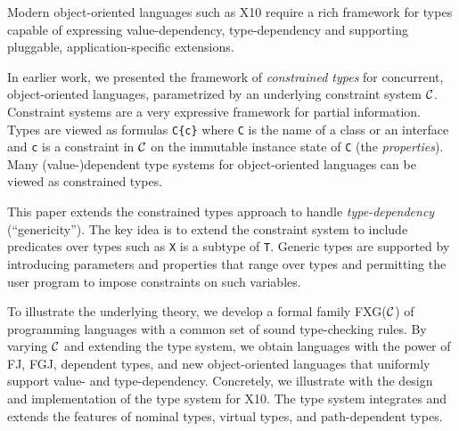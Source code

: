 Modern object-oriented languages such as X10 require a rich framework
for types capable of expressing value-dependency, type-dependency
and supporting pluggable, application-specific extensions.

In earlier work, we presented the framework of \emph{constrained
types} for concurrent, object-oriented languages, parametrized by
an underlying constraint system $\cal C$. Constraint systems are a
very expressive framework for partial information. Types are viewed
as formulas \texttt{C\{c\}} where \texttt{C} is the name of a class
or an interface and \texttt{c} is a constraint in $\cal C$ on the
immutable instance state of \texttt{C} (the \emph{properties}).
Many (value-)dependent type systems for object-oriented languages
can be viewed as constrained types.

This paper extends the constrained types approach to handle
\emph{type-dependency} (``genericity''). The key idea is to extend
the constraint system to include predicates over types such as
\texttt{X} is a subtype of \texttt{T}.  Generic types are supported
by introducing parameters and properties that range over types and
permitting the user program to impose constraints on such variables.

To illustrate the underlying theory, we develop a formal family
FXG($\cal C$) of programming languages with a common set of sound
type-checking rules.  By varying $\cal C$ and extending the type
system, we obtain languages with the power of FJ, FGJ, dependent
types, and new object-oriented languages that uniformly support
value- and type-dependency.  Concretely, we illustrate with the
design and implementation of the type system for X10.  The type
system integrates and extends the features of nominal types, virtual
types, and path-dependent types.
